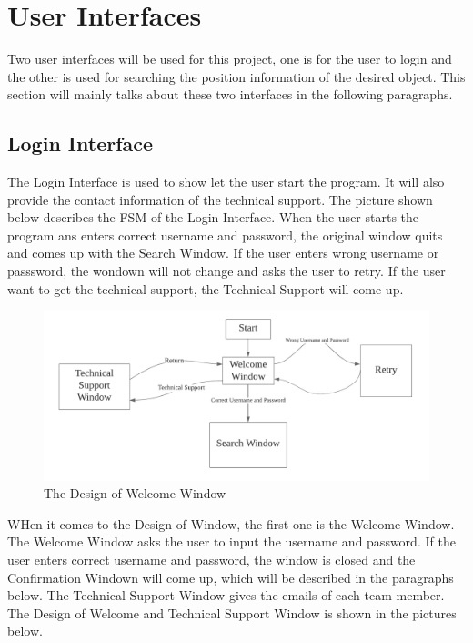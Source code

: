 \documentclass[12pt, titlepage]{article}
\begin{document}
\section{User Interfaces}

Two user interfaces will be used for this project, one is for the user to login and the other is used for searching the position information of the desired object. This section will mainly talks about these two interfaces in the following paragraphs. 

\subsection{Login Interface}
The Login Interface is used to show let the user start the program. It will also provide the contact information of the technical support. The picture shown below describes the FSM of the Login Interface. When the user starts the program ans enters correct username and password, the original window quits and comes up with the Search Window. If the user enters wrong username or passsword, the wondown will not change and asks the user to retry. If the user want to get the technical support, the Technical Support will come up. 

\begin{figure}[H]
    \centering
    \includegraphics[scale=0.8]{FSM1.png}
    \caption{The Design of Welcome Window}
\end{figure}

WHen it comes to the Design of Window, the first one is the Welcome Window. The Welcome Window asks the user to input the username and password. If the user enters correct username and password, the window is closed and the Confirmation Windown will come up, which will be described in the paragraphs below. The Technical Support Window gives the emails of each team member. The Design of Welcome and Technical Support Window is shown in the pictures below. 
\end{document}
